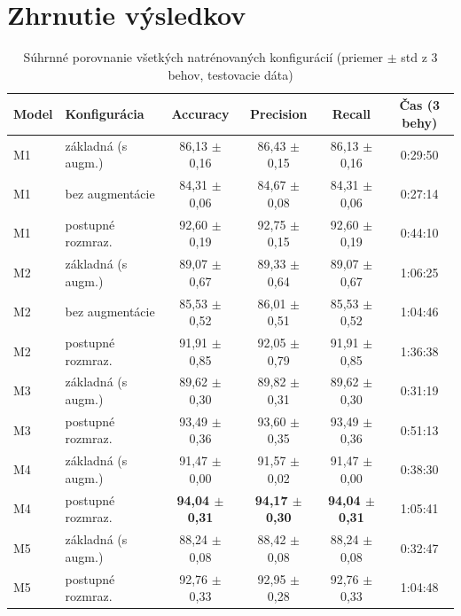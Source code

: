 \section{Zhrnutie výsledkov}
\label{sec:zhrnutie}

\begin{table}[H]
    \centering
    \caption{Súhrnné porovnanie všetkých natrénovaných konfigurácií (priemer $\pm$ std z 3 behov, testovacie dáta)}
    \label{tab:summary}
    \footnotesize
    \begin{tabular}{llcccc}
        \toprule
        Model & Konfigurácia & Accuracy & Precision & Recall & Čas (3 behy) \\
        \midrule
        M1 & základná (s augm.)     & 86,13 $\pm$ 0,16 & 86,43 $\pm$ 0,15 & 86,13 $\pm$ 0,16 & 0:29:50 \\
        M1 & bez augmentácie        & 84,31 $\pm$ 0,06 & 84,67 $\pm$ 0,08 & 84,31 $\pm$ 0,06 & 0:27:14 \\
        M1 & postupné rozmraz.      & 92,60 $\pm$ 0,19 & 92,75 $\pm$ 0,15 & 92,60 $\pm$ 0,19 & 0:44:10 \\
        \midrule
        M2 & základná (s augm.)     & 89,07 $\pm$ 0,67 & 89,33 $\pm$ 0,64 & 89,07 $\pm$ 0,67 & 1:06:25 \\
        M2 & bez augmentácie        & 85,53 $\pm$ 0,52 & 86,01 $\pm$ 0,51 & 85,53 $\pm$ 0,52 & 1:04:46 \\
        M2 & postupné rozmraz.      & 91,91 $\pm$ 0,85 & 92,05 $\pm$ 0,79 & 91,91 $\pm$ 0,85 & 1:36:38 \\
        \midrule
        M3 & základná (s augm.)     & 89,62 $\pm$ 0,30 & 89,82 $\pm$ 0,31 & 89,62 $\pm$ 0,30 & 0:31:19 \\
        M3 & postupné rozmraz.      & 93,49 $\pm$ 0,36 & 93,60 $\pm$ 0,35 & 93,49 $\pm$ 0,36 & 0:51:13 \\
        \midrule
        M4 & základná (s augm.)     & 91,47 $\pm$ 0,00 & 91,57 $\pm$ 0,02 & 91,47 $\pm$ 0,00 & 0:38:30 \\
        M4 & postupné rozmraz.      & \textbf{94,04 $\pm$ 0,31} & \textbf{94,17 $\pm$ 0,30} & \textbf{94,04 $\pm$ 0,31} & 1:05:41 \\
        \midrule
        M5 & základná (s augm.)     & 88,24 $\pm$ 0,08 & 88,42 $\pm$ 0,08 & 88,24 $\pm$ 0,08 & 0:32:47 \\
        M5 & postupné rozmraz.      & 92,76 $\pm$ 0,33 & 92,95 $\pm$ 0,28 & 92,76 $\pm$ 0,33 & 1:04:48 \\
        \bottomrule
    \end{tabular}
\end{table}

